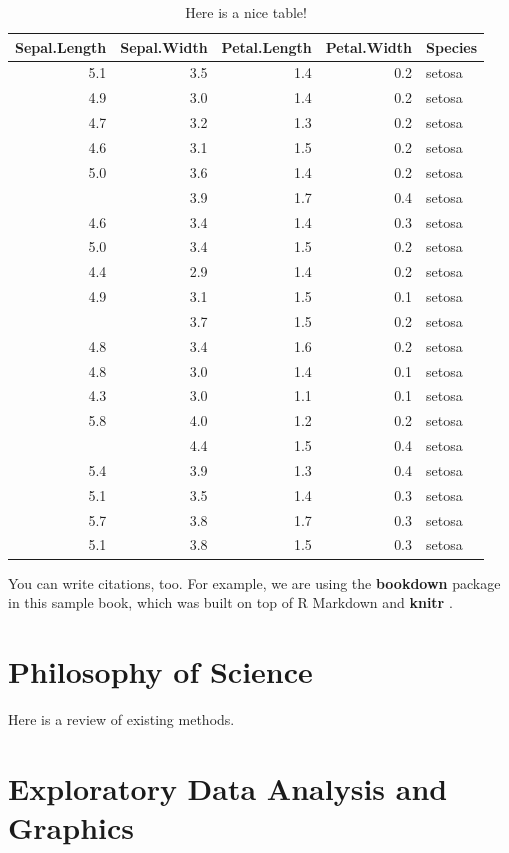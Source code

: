 \documentclass[
]{book}
\begin{document}
\begin{table}

\caption{\label{tab:nice-tab}Here is a nice table!}
\centering
\begin{tabular}[t]{rrrrl}
\toprule
Sepal.Length & Sepal.Width & Petal.Length & Petal.Width & Species\\
\midrule
5.1 & 3.5 & 1.4 & 0.2 & setosa\\
4.9 & 3.0 & 1.4 & 0.2 & setosa\\
4.7 & 3.2 & 1.3 & 0.2 & setosa\\
4.6 & 3.1 & 1.5 & 0.2 & setosa\\
5.0 & 3.6 & 1.4 & 0.2 & setosa\\
\addlinespace
5.4 & 3.9 & 1.7 & 0.4 & setosa\\
4.6 & 3.4 & 1.4 & 0.3 & setosa\\
5.0 & 3.4 & 1.5 & 0.2 & setosa\\
4.4 & 2.9 & 1.4 & 0.2 & setosa\\
4.9 & 3.1 & 1.5 & 0.1 & setosa\\
\addlinespace
5.4 & 3.7 & 1.5 & 0.2 & setosa\\
4.8 & 3.4 & 1.6 & 0.2 & setosa\\
4.8 & 3.0 & 1.4 & 0.1 & setosa\\
4.3 & 3.0 & 1.1 & 0.1 & setosa\\
5.8 & 4.0 & 1.2 & 0.2 & setosa\\
\addlinespace
5.7 & 4.4 & 1.5 & 0.4 & setosa\\
5.4 & 3.9 & 1.3 & 0.4 & setosa\\
5.1 & 3.5 & 1.4 & 0.3 & setosa\\
5.7 & 3.8 & 1.7 & 0.3 & setosa\\
5.1 & 3.8 & 1.5 & 0.3 & setosa\\
\bottomrule
\end{tabular}
\end{table}

You can write citations, too. For example, we are using the \textbf{bookdown} package \citep{R-bookdown} in this sample book, which was built on top of R Markdown and \textbf{knitr} \citep{xie2015}.

\chapter{Philosophy of Science}\label{philosophy-of-science}

Here is a review of existing methods.

\chapter{Exploratory Data Analysis and Graphics}\label{exploratory-data-analysis-and-graphics}
\end{document}
